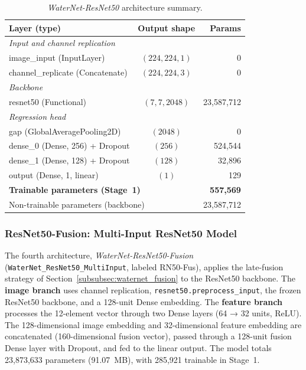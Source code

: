 \begin{table}[htbp]
    \caption{\textit{WaterNet-ResNet50} architecture summary.}
    \begin{center}
        \small
        \begin{tabular}{|l|c|r|}
        \hline
        \textbf{Layer (type)} & \textbf{Output shape} & \textbf{Params} \\
        \hline
        \multicolumn{3}{|l|}{\textit{Input and channel replication}} \\
        \hline
        image\_input (InputLayer)
            & $(224, 224, 1)$ & 0 \\
        channel\_replicate (Concatenate)
            & $(224, 224, 3)$ & 0 \\
        \hline
        \multicolumn{3}{|l|}{\textit{Backbone}} \\
        \hline
        resnet50 (Functional)
            & $(7, 7, 2048)$ & 23{,}587{,}712 \\
        \hline
        \multicolumn{3}{|l|}{\textit{Regression head}} \\
        \hline
        gap (GlobalAveragePooling2D)
            & $(2048)$ & 0 \\
        dense\_0 (Dense, 256) + Dropout
            & $(256)$ & 524{,}544 \\
        dense\_1 (Dense, 128) + Dropout
            & $(128)$ & 32{,}896 \\
        output (Dense, 1, linear)
            & $(1)$ & 129 \\
        \hline
        \multicolumn{2}{|l|}{\textbf{Trainable parameters (Stage~1)}}
            & \textbf{557{,}569} \\
        \hline
        \multicolumn{2}{|l|}{Non-trainable parameters (backbone)}
            & 23{,}587{,}712 \\
        \hline
        \end{tabular}
    \label{tab:resnet50_arch}
    \end{center}
\end{table}

\subsubsection{ResNet50-Fusion: Multi-Input ResNet50 Model}
\label{subsubsec:resnet50_fusion}

The fourth architecture, \textit{WaterNet-ResNet50-Fusion}
(\texttt{WaterNet\_ResNet50\_MultiInput}, labeled RN50-Fus), applies the late-fusion strategy of Section~\ref{subsubsec:waternet_fusion} to the ResNet50 backbone. The \textbf{image branch} uses channel replication, \texttt{resnet50.preprocess\_input}, the frozen ResNet50 backbone, and a 128-unit Dense embedding. The \textbf{feature branch} processes the 12-element vector through two Dense layers (64 → 32 units, ReLU). The 128-dimensional image embedding and 32-dimensional feature embedding are concatenated (160-dimensional fusion vector), passed through a 128-unit fusion Dense layer with Dropout, and fed to the linear output. The model totals 23{,}873{,}633 parameters (91.07~MB), with 285{,}921 trainable in Stage~1.

